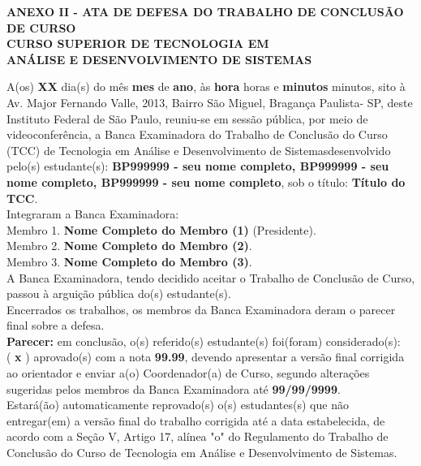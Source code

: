 \documentclass[12pt,a4paper]{report}
\newcommand{\instituicao}{Instituto Federal de São Paulo}
\newcommand{\cidade}{Bragança Paulista}
\newcommand{\curso}{Tecnologia em Análise e Desenvolvimento de Sistemas}
\newcommand{\cursoA}{CURSO SUPERIOR DE TECNOLOGIA EM \\ANÁLISE E DESENVOLVIMENTO DE SISTEMAS}
\newcommand{\cabecalho}{ANEXO II - ATA DE DEFESA DO TRABALHO DE CONCLUSÃO DE CURSO}
\newcommand{\tema}{Título do TCC}
\newcommand{\dia}{XX}
\newcommand{\mes}{mes}
\newcommand{\ano}{ano}
\newcommand{\hora}{hora}
\newcommand{\minutos}{minutos}
\newcommand{\alunoA}{seu nome completo} %
\newcommand{\alunoB}{seu nome completo}
\newcommand{\alunoC}{seu nome completo}
\newcommand{\prontuarioA}{BP999999} %
\newcommand{\prontuarioB}{BP999999}
\newcommand{\prontuarioC}{BP999999}
\newcommand{\membroA}{Nome Completo do Membro (1)}
\newcommand{\membroB}{Nome Completo do Membro (2)}
\newcommand{\membroC}{Nome Completo do Membro (3)}
\newcommand{\nota}{99.99}
\newcommand{\dataentrega}{99/99/9999}
\begin{document}
	
	
	\mdseries \normalsize
	\begin{center}
		{\textbf{\cabecalho}}\\
		\vspace{0.1cm}
		\textbf{\cursoA}
	\end{center}
	
	\noindent A(os) \textbf{\dia} dia(s) do mês \textbf{\mes} de \textbf{\ano}, às \textbf{\hora} horas e  \textbf{\minutos} minutos, sito à Av. Major Fernando Valle, 2013, Bairro São Miguel, \cidade - SP, deste \instituicao, reuniu-se em sessão pública, por meio de videoconferência, a Banca Examinadora do Trabalho de Conclusão do Curso (TCC) de \curso  desenvolvido pelo(s) estudante(s): 
	\textbf{\prontuarioA  \hspace{0.01cm} - \alunoA, \prontuarioB  \hspace{0.01cm} - \alunoB,  \prontuarioC  \hspace{0.01cm} - \alunoC}, sob o título: \textbf{\tema}. \vspace{0.2cm} \\
	\noindent Integraram a Banca Examinadora:\vspace{2pt}\\
	\noindent Membro 1. \textbf{\membroA} (Presidente). \vspace{2pt}\\
	\noindent Membro 2. \textbf{\membroB}.\vspace{2pt} \\
	\noindent Membro 3. \textbf{\membroC}. \vspace{0.3cm} \\
	\noindent A Banca Examinadora, tendo decidido aceitar o Trabalho de Conclusão de Curso, passou à arguição pública do(s) estudante(s). \vspace{0.3cm}\\
    \noindent Encerrados os trabalhos, os membros da Banca Examinadora deram o parecer final sobre a defesa. \vspace{0.2cm} \\
    \noindent \textbf{Parecer:} em conclusão, o(s) referido(s) estudante(s) foi(foram) considerado(s): \\
    \noindent ( \textbf{x} ) aprovado(s) com a nota \textbf{\nota}, devendo apresentar a versão final corrigida ao orientador e enviar a(o) Coordenador(a) de Curso, segundo alterações sugeridas pelos membros da Banca Examinadora até \textbf{\dataentrega}. \\
    \noindent Estará(ão) automaticamente reprovado(s) o(s) estudantes(s) que não entregar(em) a versão final do trabalho corrigida até a data estabelecida, de acordo com a Seção V, Artigo 17\textdegree, alínea "o" do Regulamento do Trabalho de Conclusão do Curso de \curso.
\end{document}
